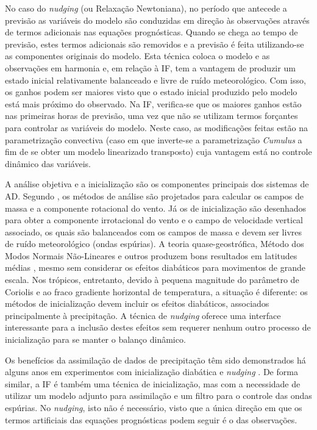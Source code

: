No caso do \textit{nudging} (ou Relaxação Newtoniana), no período que antecede a previsão as variáveis do modelo são conduzidas em direção às observações através de termos adicionais nas equações prognósticas. Quando se chega ao tempo de previsão, estes termos adicionais são removidos e a previsão é feita utilizando-se as componentes originais do modelo. Esta técnica coloca o modelo e as observações em harmonia e, em relação à IF, tem a vantagem de produzir um estado inicial relativamente balanceado e livre de ruído meteorológico. Com isso, os ganhos podem ser maiores visto que o estado inicial produzido pelo modelo está mais próximo do observado. Na IF, verifica-se que os maiores ganhos estão nas primeiras horas de previsão, uma vez que não se utilizam termos forçantes para controlar as variáveis do modelo. Neste caso, as modificações feitas estão na parametrização convectiva (caso em que inverte-se a parametrização \textit{Cumulus} a fim de se obter um modelo linearizado transposto) cuja vantagem está no controle dinâmico das variáveis.

A análise objetiva e a inicialização são os componentes principais dos sistemas de AD. Segundo , os métodos de análise são projetados para calcular os campos de massa e a componente rotacional do vento. Já os de inicialização são desenhados para obter a componente irrotacional do vento e o campo de velocidade vertical associado, os quais são balanceados com os campos de massa e devem ser livres de ruído meteorológico (ondas espúrias). A teoria quase-geostrófica, Método dos Modos Normais Não-Lineares e outros produzem bons resultados em latitudes médias \cite{krishnamurtietal91}, mesmo sem considerar os efeitos diabáticos para movimentos de grande escala. Nos trópicos, entretanto, devido à pequena magnitude do parâmetro de Coriolis e ao fraco gradiente horizontal de temperatura, a situação é diferente: os métodos de inicialização devem incluir os efeitos diabáticos, associados principalmente à precipitação. A técnica de \textit{nudging} oferece uma interface interessante para a inclusão destes efeitos sem requerer nenhum outro processo de inicialização para se manter o balanço dinâmico.

Os benefícios da assimilação de dados de precipitação têm sido demonstrados há alguns anos em experimentos com inicialização diabática e \textit{nudging} \cite{zupanskimesinger95}. De forma similar, a IF é também uma técnica de inicialização, mas com a necessidade de utilizar um modelo adjunto para assimilação e um filtro para o controle das ondas espúrias. No \textit{nudging}, isto não é necessário, visto que a única direção em que os termos artificiais das equações prognósticas podem seguir é o das observações.

